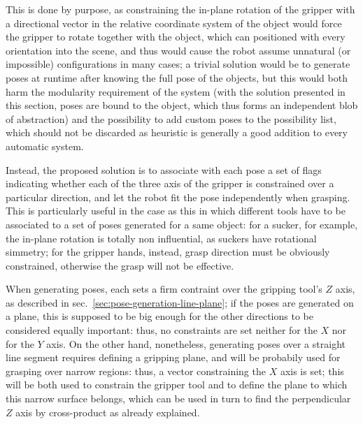 This is done by purpose, as constraining the in-plane rotation of the
gripper with a directional vector in the relative coordinate system of
the object would force the gripper to rotate together with the object,
which can positioned with every orientation into the scene, and thus
would cause the robot assume unnatural (or impossible) configurations
in many cases; a trivial solution would be to generate poses at
runtime after knowing the full pose of the objects, but this would
both harm the modularity requirement of the system (with the solution
presented in this section, poses are bound to the object, which thus
forms an independent blob of abstraction) and the possibility to add
custom poses to the possibility list, which should not be discarded as
heuristic is generally a good addition to every automatic system.

Instead, the proposed solution is to associate with each pose a set of
flags indicating whether each of the three axis of the gripper is
constrained over a particular direction, and let the robot fit the
pose independently when grasping. This is particularly useful in the
case as this in which different tools have to be associated to a set
of poses generated for a same object: for a sucker, for example, the
in-plane rotation is totally non influential, as suckers have
rotational simmetry; for the gripper hands, instead, grasp direction
must be obviously constrained, otherwise the grasp will not be effective.

When generating poses, each sets a firm contraint over the gripping
tool's $Z$ axis, as described in
sec.~\ref{sec:pose-generation-line-plane}; if the poses are generated
on a plane, this is supposed to be big enough for the other directions
to be considered equally important: thus, no constraints are set
neither for the $X$ nor for the $Y$ axis. On the other hand,
nonetheless, generating poses over a straight line segment requires
defining a gripping plane, and will be probabily used for grasping
over narrow regions: thus, a vector constraining the $X$ axis is set;
this will be both used to constrain the gripper tool and to define the
plane to which this narrow surface belongs, which can be used in turn
to find the perpendicular $Z$ axis by cross-product as already explained.
